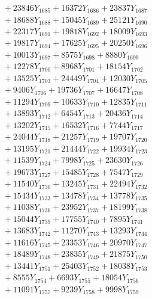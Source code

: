 \documentclass[a4paper,10pt]{article}
\begin{document}
{\begin{align}
&\;  + 23846 Y_{1685} + 16372 Y_{1686} + 23837 Y_{1687} \\[0.3ex]
&\;  + 18688 Y_{1688} + 15045 Y_{1689} + 25121 Y_{1690} \\[0.3ex]
&\;  + 22317 Y_{1691} + 19818 Y_{1692} + 18009 Y_{1693} \\[0.3ex]
&\;  + 19817 Y_{1694} + 17625 Y_{1695} + 20250 Y_{1696} \\[0.3ex]
&\;  + 10013 Y_{1697} + 8575 Y_{1698} + 8880 Y_{1699} \\[0.3ex]
&\;  + 12278 Y_{1700} + 8968 Y_{1701} + 18154 Y_{1702} \\[0.3ex]
&\;  + 13525 Y_{1703} + 24449 Y_{1704} + 12030 Y_{1705} \\[0.3ex]
&\;  + 9406 Y_{1706} + 19736 Y_{1707} + 16647 Y_{1708} \\[0.5ex]\allowbreak
&\;  + 11294 Y_{1709} + 10633 Y_{1710} + 12835 Y_{1711} \\[0.3ex]
&\;  + 13893 Y_{1712} + 6454 Y_{1713} + 20436 Y_{1714} \\[0.3ex]
&\;  + 13202 Y_{1715} + 16532 Y_{1716} + 7744 Y_{1717} \\[0.3ex]
&\;  + 24044 Y_{1718} + 21257 Y_{1719} + 19707 Y_{1720} \\[0.3ex]
&\;  + 13195 Y_{1721} + 21444 Y_{1722} + 19934 Y_{1723} \\[0.3ex]
&\;  + 11539 Y_{1724} + 7998 Y_{1725} + 23630 Y_{1726} \\[0.3ex]
&\;  + 19673 Y_{1727} + 15485 Y_{1728} + 7547 Y_{1729} \\[0.3ex]
&\;  + 11540 Y_{1730} + 13245 Y_{1731} + 22494 Y_{1732} \\[0.3ex]
&\;  + 15434 Y_{1733} + 13478 Y_{1734} + 13778 Y_{1735} \\[0.3ex]
&\;  + 11038 Y_{1736} + 23952 Y_{1737} + 18199 Y_{1738} \\[0.5ex]\allowbreak
&\;  + 15044 Y_{1739} + 17755 Y_{1740} + 7895 Y_{1741} \\[0.3ex]
&\;  + 13683 Y_{1742} + 11270 Y_{1743} + 13293 Y_{1744} \\[0.3ex]
&\;  + 11616 Y_{1745} + 23353 Y_{1746} + 20970 Y_{1747} \\[0.3ex]
&\;  + 18489 Y_{1748} + 23835 Y_{1749} + 21875 Y_{1750} \\[0.3ex]
&\;  + 13441 Y_{1751} + 25403 Y_{1752} + 18038 Y_{1753} \\[0.3ex]
&\;  + 8555 Y_{1754} + 6693 Y_{1755} + 18054 Y_{1756} \\[0.3ex]
&\;  + 11091 Y_{1757} + 9239 Y_{1758} + 9998 Y_{1759} \\[0.3ex]

\end{align}}
\end{document}

